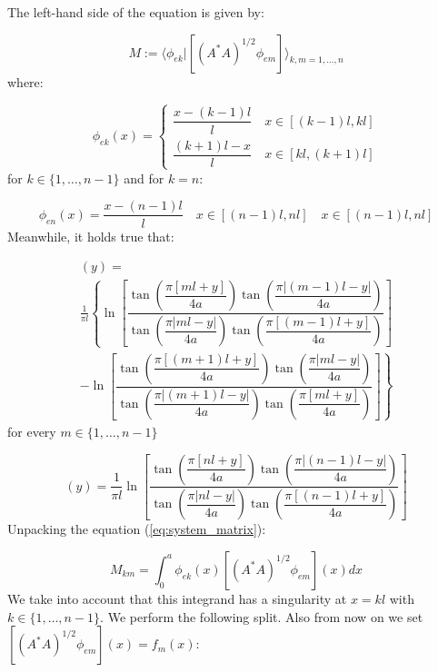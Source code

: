 \documentclass{article}
\begin{document}
The left-hand side of the equation is given by:

\begin{equation} \label{eq:system_matrix}
    M := \langle \phi_{ek} | [(A^*A)^{1/2}\phi_{em}] \rangle_{k,m=1,\dots,n}
\end{equation}
where:

\begin{equation}
    \phi_{ek}(x) =
    \begin{cases}
        \dfrac{x - (k-1)l}{l} \quad x \in [(k-1)l, kl] \\
        \dfrac{(k+1)l - x}{l} \quad x \in [kl, (k+1)l]
    \end{cases}
\end{equation}
for $k \in \{1, \dots, n-1\}$ and for $k=n$:

\begin{equation}
    \phi_{en}(x) =
    \dfrac{x - (n-1)l}{l} \quad x \in [(n-1)l, nl] \quad x \in [(n-1)l, nl]
\end{equation}
Meanwhile, it holds true that:

\begin{multline}
    [(A^*A)^{1/2}\phi_{em}](y) = \\ \frac{1}{\pi l}\left\{ \ln{\left[\dfrac{\tan{\left(\dfrac{\pi[ml+y]}{4a}\right)}\tan{\left(\dfrac{\pi|(m-1)l-y|}{4a}\right)}}{\tan{\left(\dfrac{\pi|ml-y|}{4a}\right)}\tan{\left(\dfrac{\pi[(m-1)l+y]}{4a}\right)}}\right]} \right. \\
     \left. -  \ln{\left[\dfrac{\tan{\left(\dfrac{\pi[(m+1)l+y]}{4a}\right)}\tan{\left(\dfrac{\pi|ml-y|}{4a}\right)}}{\tan{\left(\dfrac{\pi|(m+1)l-y|}{4a}\right)}\tan{\left(\dfrac{\pi[ml+y]}{4a}\right)}}\right]}\right\}
\end{multline}
for every $m \in \{1,\dots,n-1\}$

\begin{equation}
    [(A^*A)^{1/2}\phi_{en}](y) = \frac{1}{\pi l} \ln{\left[\dfrac{\tan{\left(\dfrac{\pi[nl+y]}{4a}\right)}\tan{\left(\dfrac{\pi|(n-1)l-y|}{4a}\right)}}{\tan{\left(\dfrac{\pi|nl-y|}{4a}\right)}\tan{\left(\dfrac{\pi[(n-1)l+y]}{4a}\right)}}\right]}   
\end{equation}
Unpacking the equation (\ref{eq:system_matrix}):

\begin{equation}
    M_{km} = \int_0^a \phi_{ek} (x)[(A^*A)^{1/2}\phi_{em}](x)dx
\end{equation}
We take into account that this integrand has a singularity at $x=kl$ with $k \in \{1, \dots, n-1\}$. We perform the following split. Also from now on we set $[(A^*A)^{1/2}\phi_{em}](x) = f_m(x)$:
\end{document}
